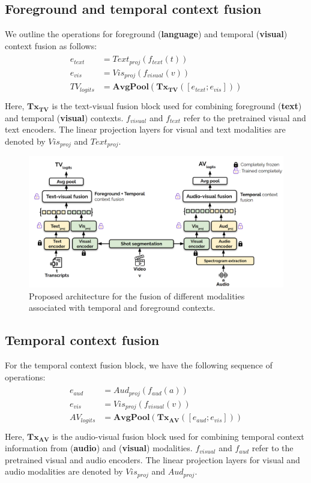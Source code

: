 \subsection{Foreground and temporal context fusion}
We outline the operations for foreground (\textbf{language}) and temporal (\textbf{visual}) context fusion as follows:
 \begin{align}
    \begin{split}
     e_{text}&=Text_{proj}(f_{text}(t))\\
     e_{vis}&=Vis_{proj}(f_{visual}(v)) \\ 
     TV_{logits}&=\mathbf{AvgPool}(\mathbf{{Tx}_{TV}}([e_{text};e_{vis}])) \\
    \end{split}
 \end{align}
 Here, $\mathbf{{Tx}_{TV}}$ is the text-visual fusion block used for combining foreground (\textbf{text}) and temporal (\textbf{visual}) contexts. $f_{visual}$ and $f_{text}$ refer to the pretrained visual and text encoders. The linear projection layers for visual and text modalities are denoted by $Vis_{proj}$ and $Text_{proj}$. 
 \begin{figure}[h!]
     \centering
     \includegraphics[width=\textwidth]{figures/ads_modeling_structure.png}
    \caption{Proposed architecture for the fusion of different modalities associated with temporal and foreground contexts. }
\end{figure}
\subsection{Temporal context fusion}
For the temporal context fusion block, we have the following sequence of operations:
\begin{align}
    \begin{split}
     e_{aud}&=Aud_{proj}(f_{aud}(a))\\
     e_{vis}&=Vis_{proj}(f_{visual}(v)) \\ 
     AV_{logits}&=\mathbf{AvgPool}(\mathbf{{Tx}_{AV}}([e_{aud};e_{vis}])) \\
    \end{split}
\end{align}
 Here, $\mathbf{{Tx}_{AV}}$ is the audio-visual fusion block used for combining temporal context information from (\textbf{audio}) and   (\textbf{visual}) modalities. $f_{visual}$ and $f_{aud}$ refer to the pretrained visual and audio encoders. The linear projection layers for visual and audio modalities are denoted by $Vis_{proj}$ and $Aud_{proj}$. 

